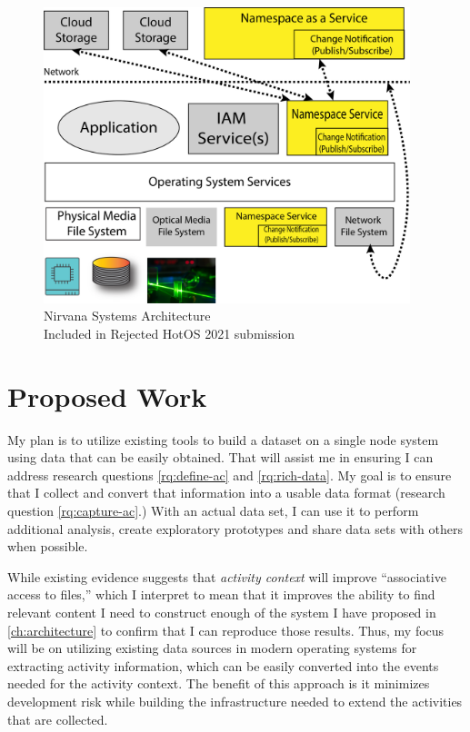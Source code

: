 \begin{figure}[!htb]
    \centering
    \caption{Nirvana Systems Architecture \\ Included in Rejected HotOS 2021 submission}
    \label{figure:hotos21-nirvana-arch}
    \includegraphics[width=0.95\textwidth]{reference/hotos21/figures/nirvana-arch-8.png}
\end{figure}


\section{Proposed Work}
\label{ch:plan:sec:proposed-work}

My plan is to utilize existing tools to build a dataset on a single
node system using data that can be easily obtained.  That will assist me in
ensuring I can address research questions \ref{rq:define-ac} and
\ref{rq:rich-data}.  My goal is to ensure that I collect and convert that
information into a usable data format (research question \ref{rq:capture-ac}.)
With an actual data set, I can use it to perform additional analysis, create
exploratory prototypes and share data sets with others when possible.

While existing evidence suggests that \emph{activity context} will improve
``associative access to files,'' which I interpret to mean
that it improves the ability to find relevant content I need to construct enough
of the system I have proposed in \autoref{ch:architecture} to confirm that I can
reproduce those results.  Thus, my focus will be on utilizing existing
data sources in modern operating systems for extracting activity information,
which can be easily converted into the events needed for the activity context.
The benefit of this approach is it minimizes development risk while building the
infrastructure needed to extend the activities that are collected.

